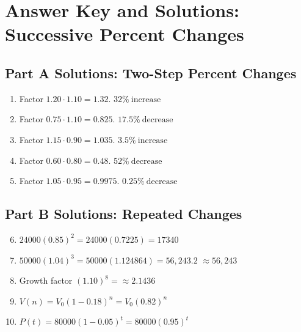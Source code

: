 \documentclass[14pt]{extarticle}
\begin{document}
\newpage


\section*{Answer Key and Solutions: Successive Percent Changes}

\subsection*{Part A Solutions: Two-Step Percent Changes}
\begin{enumerate}
  \item Factor \(1.20\cdot1.10=1.32\). \(\boxed{32\%\ \text{increase}}\)
  \item Factor \(0.75\cdot1.10=0.825\). \(\boxed{17.5\%\ \text{decrease}}\)
  \item Factor \(1.15\cdot0.90=1.035\). \(\boxed{3.5\%\ \text{increase}}\)
  \item Factor \(0.60\cdot0.80=0.48\). \(\boxed{52\%\ \text{decrease}}\)
  \item Factor \(1.05\cdot0.95=0.9975\). \(\boxed{0.25\%\ \text{decrease}}\)
\end{enumerate}

\subsection*{Part B Solutions: Repeated Changes}
\begin{enumerate}
  \setcounter{enumi}{5}
  \item \(24000(0.85)^2=24000(0.7225)=\boxed{17340}\)
  \item \(50000(1.04)^3=50000(1.124864)=\boxed{56{,}243.2}\) \(\approx \boxed{56{,}243}\)
  \item Growth factor \((1.10)^8=\boxed{\approx 2.1436}\)
  \item \(V(n)=V_0(1-0.18)^n=\boxed{V_0(0.82)^n}\)
  \item \(P(t)=80000(1-0.05)^t=\boxed{80000(0.95)^t}\)
\end{enumerate}
\end{document}

